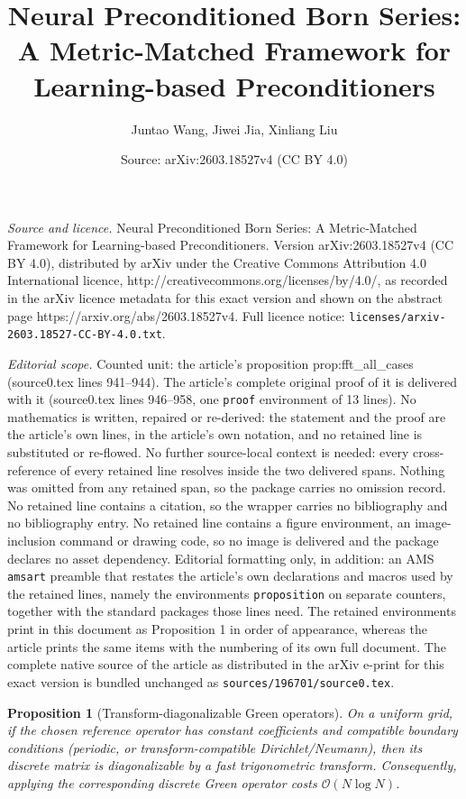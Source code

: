 \documentclass[10pt,a4paper]{amsart}
\title{Neural Preconditioned Born Series: A Metric-Matched Framework for Learning-based Preconditioners}
\author{Juntao Wang, Jiwei Jia, Xinliang Liu}
\date{Source: arXiv:2603.18527v4 (CC BY 4.0)}
\newtheorem{proposition}{Proposition}
\begin{document}
\maketitle

\noindent\emph{Source and licence.} Neural Preconditioned Born Series: A Metric-Matched Framework for Learning-based Preconditioners. Version arXiv:2603.18527v4 (CC BY 4.0), distributed by arXiv under the Creative Commons Attribution 4.0 International licence, http://creativecommons.org/licenses/by/4.0/, as recorded in the arXiv licence metadata for this exact version and shown on the abstract page https://arxiv.org/abs/2603.18527v4. Full licence notice: \texttt{licenses/arxiv-2603.18527-CC-BY-4.0.txt}.\par\smallskip

\noindent\textit{Editorial scope.} Counted unit: the article's proposition prop:fft\_all\_cases (source0.tex lines 941--944). The article's complete original proof of it is delivered with it (source0.tex lines 946--958, one \texttt{proof} environment of 13 lines). No mathematics is written, repaired or re-derived: the statement and the proof are the article's own lines, in the article's own notation, and no retained line is substituted or re-flowed.  No further source-local context is needed: every cross-reference of every retained line resolves inside the two delivered spans.  Nothing was omitted from any retained span, so the package carries no omission record.  No retained line contains a citation, so the wrapper carries no bibliography and no bibliography entry.  No retained line contains a figure environment, an image-inclusion command or drawing code, so no image is delivered and the package declares no asset dependency.  Editorial formatting only, in addition: an AMS \texttt{amsart} preamble that restates the article's own declarations and macros used by the retained lines, namely the environments \texttt{proposition} on separate counters, together with the standard packages those lines need.  The retained environments print in this document as Proposition 1 in order of appearance, whereas the article prints the same items with the numbering of its own full document.  The complete native source of the article as distributed in the arXiv e-print for this exact version is bundled unchanged as \texttt{sources/196701/source0.tex}.
\begin{proposition}[Transform-diagonalizable Green operators]
\label{prop:fft_all_cases}
On a uniform grid, if the chosen reference operator has constant coefficients and compatible boundary conditions (periodic, or transform-compatible Dirichlet/Neumann), then its discrete matrix is diagonalizable by a fast trigonometric transform. Consequently, applying the corresponding discrete Green operator costs $\mathcal{O}(N\log N)$.
\end{proposition}
\end{document}
